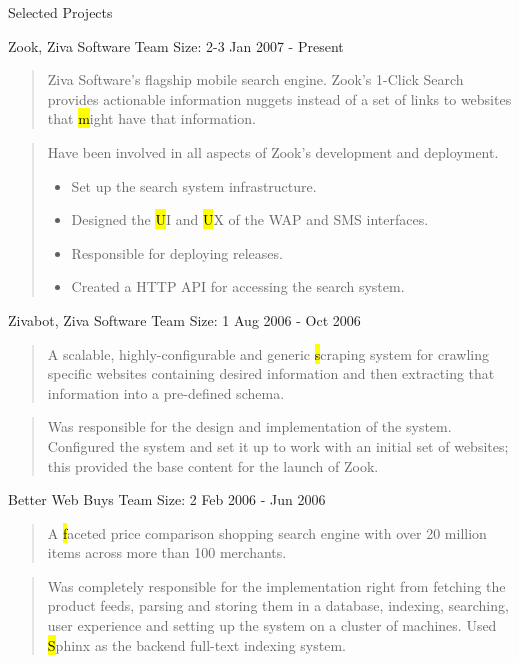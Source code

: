 \documentclass{resume}
\newcommand{\teamsize}{\hfill\sc\footnotesize Team Size: }
\begin{document}
\begin{category}{Selected Projects}{}
    \item {\topic Zook,} Ziva Software
        {\teamsize 2-3}
        {\period Jan 2007 - Present}

        \begin{quote}
            Ziva Software's flagship mobile search engine. Zook's 1-Click
            Search provides actionable information nuggets instead of a set of
            links to websites that {\hl might} have that information.
        \end{quote}

        \begin{quote}
            Have been involved in all aspects of Zook's development and
            deployment.
            \begin{itemize}
                \item Set up the search system infrastructure.
                \item Designed the {\hl UI} and {\hl UX} of the WAP and SMS
                    interfaces.
                \item Responsible for deploying releases.
                \item Created a HTTP API for accessing the search system.
            \end{itemize}
        \end{quote}

    \pagebreak

    \item {\topic Zivabot,} Ziva Software
        {\teamsize 1}
        {\period Aug 2006 - Oct 2006}
        \begin{quote}
            A scalable, highly-configurable and generic {\hl scraping system}
            for crawling specific websites containing desired information and
            then extracting that information into a pre-defined schema.
        \end{quote}
        \begin{quote}
            Was responsible for the design and implementation of the system.
            Configured the system and set it up to work with an initial set of
            websites; this provided the base content for the launch of Zook.
        \end{quote}

    \item {\topic Better Web Buys}
        {\teamsize 2}
        {\period Feb 2006 - Jun 2006}
        \begin{quote}
            A {\hl faceted price comparison shopping search engine} with over
            20 million items across more than 100 merchants.
        \end{quote}
        \begin{quote}
            Was completely responsible for the implementation right from
            fetching the product feeds, parsing and storing them in a database,
            indexing, searching, user experience and setting up the system on a
            cluster of machines. Used {\hl Sphinx} as the backend full-text
            indexing system.
        \end{quote}


\end{category}
\end{document}
